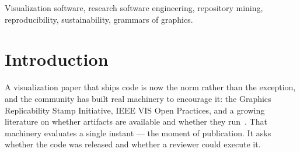 \documentclass[9pt,twocolumn,letterpaper]{article}
\begin{document}
\maketitle

\begin{abstract}
The visualization community increasingly ships software with its papers, and
some of that software has become infrastructure that the rest of the field
builds on. We know a good deal about whether research code is \emph{released};
we know very little about whether it is \emph{maintained}. We mine the full
commit histories of \ecorepos{} repositories in the Protovis\,$\rightarrow$\,D3\,%
$\rightarrow$\,Vega\,$\rightarrow$\,Vega-Lite\,$\rightarrow$\,Mosaic lineage,
together with ten comparison toolkits, and report four measurements. Effort is
extraordinarily concentrated: \ecobusfifty{} people account for half of
\ecocommits{} human commits by \ecohumans{} people. Human effort collapses
rather than plateaus: Vega-Lite fell from \vlpeak{} human commits in
\vlpeakyear{} to \vlrecent{} in the last twelve months, a \vldecline\% decline.
Automation fills the vacuum: \vlbotshare\% of Vega-Lite's recent commits are
written by bots, and in three sibling repositories bots write more than four
commits in five. And award-winning artifacts go dormant early --- Voyager's
last human commit predates its Test-of-Time award by four years. We argue that
release-time reproducibility checks measure the wrong moment, and sketch a
lightweight maintenance disclosure that would make the situation legible.
\end{abstract}

\begin{indexterms}
Visualization software, research software engineering, repository mining,
reproducibility, sustainability, grammars of graphics.
\end{indexterms}

\section{Introduction}

A visualization paper that ships code is now the norm rather than the
exception, and the community has built real machinery to encourage it: the
Graphics Replicability Stamp Initiative, IEEE VIS Open Practices, and a
growing literature on whether artifacts are available and whether they
run~\cite{isenberg2024stamps}. That machinery evaluates a single instant --- the
moment of publication. It asks whether the code was released and whether a
reviewer could execute it.
\end{document}
